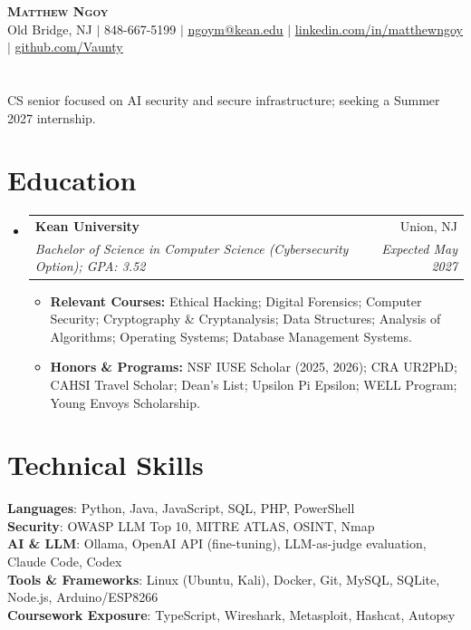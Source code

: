 \documentclass[letterpaper,11pt]{article}
\makeatletter
\newcommand{\resumeItem}[1]{
  \item\small{#1}
}
\newcommand{\resumeSubheading}[4]{
  \vspace{-1pt}\item
    \begin{tabular*}{0.97\textwidth}[t]{l@{\extracolsep{\fill}}r}
      {\normalsize\textbf{#1}} & {\normalsize #2} \\
      \textit{\small#3} & \textit{\small #4} \\
    \end{tabular*}\vspace{-7pt}
}
\newcommand{\resumeSubHeadingListStart}{\begin{itemize}[leftmargin=0.15in, label={}, topsep=0pt, partopsep=0pt, itemsep=0pt]\small}
\newcommand{\resumeSubHeadingListEnd}{\end{itemize}}
\newcommand{\resumeItemListStart}{\begin{itemize}[topsep=2pt, itemsep=-2pt, parsep=0pt]}
\newcommand{\resumeItemListEnd}{\end{itemize}\vspace{-6pt}}
\makeatother
\begin{document}
\begin{center}
    \textbf{\Huge \scshape Matthew Ngoy} \\ \vspace{2pt}
    \small Old Bridge, NJ $|$ 848-667-5199 $|$
    \href{mailto:ngoym@kean.edu}{\underline{ngoym@kean.edu}} $|$
    \href{https://linkedin.com/in/matthewngoy}{\underline{linkedin.com/in/matthewngoy}} $|$
    \href{https://github.com/Vaunty}{\underline{github.com/Vaunty}}
\end{center}\vspace{-4pt}

\section{}
{\centering\small CS senior focused on AI security and secure infrastructure; seeking a Summer 2027 internship.\par}

\section{Education}
  \resumeSubHeadingListStart
    \resumeSubheading
      {Kean University}{Union, NJ}
      {Bachelor of Science in Computer Science (Cybersecurity Option); GPA: 3.52}{Expected May 2027}
      \resumeItemListStart
        \resumeItem{\textbf{Relevant Courses:} Ethical Hacking; Digital Forensics; Computer Security; Cryptography \& Cryptanalysis; Data Structures; Analysis of Algorithms; Operating Systems; Database Management Systems.}
        \resumeItem{\textbf{Honors \& Programs:} NSF IUSE Scholar (2025, 2026); CRA UR2PhD; CAHSI Travel Scholar; Dean's List; Upsilon Pi Epsilon; WELL Program; Young Envoys Scholarship.}
      \resumeItemListEnd
  \resumeSubHeadingListEnd

\section{Technical Skills}
 \begin{itemize}[leftmargin=0.15in, label={}, topsep=0pt, partopsep=0pt]
    \small{\item{
     \textbf{Languages}{: Python, Java, JavaScript, SQL, PHP, PowerShell} \\
     \textbf{Security}{: OWASP LLM Top 10, MITRE ATLAS, OSINT, Nmap} \\
     \textbf{AI \& LLM}{: Ollama, OpenAI API (fine-tuning), LLM-as-judge evaluation, Claude Code, Codex} \\
     \textbf{Tools \& Frameworks}{: Linux (Ubuntu, Kali), Docker, Git, MySQL, SQLite, Node.js, Arduino/ESP8266} \\
     \textbf{Coursework Exposure}{: TypeScript, Wireshark, Metasploit, Hashcat, Autopsy}
    }}
 \end{itemize}
\end{document}
